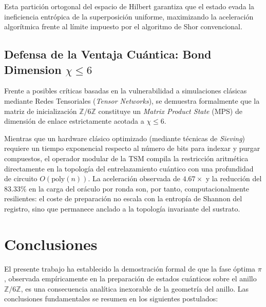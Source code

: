 \documentclass[12pt,a4paper]{article}
\theoremstyle{plain}
\theoremstyle{definition}
\theoremstyle{remark}
\begin{document}
Esta partición ortogonal del espacio de Hilbert garantiza que el estado evada la ineficiencia entrópica de la superposición uniforme, maximizando la aceleración algorítmica frente al límite impuesto por el algoritmo de Shor convencional.

\subsection{Defensa de la Ventaja Cuántica: Bond Dimension $\chi \le 6$}

Frente a posibles críticas basadas en la vulnerabilidad a simulaciones clásicas mediante Redes Tensoriales (\textit{Tensor Networks}), se demuestra formalmente que la matriz de inicialización $\mathbb{Z}/6\mathbb{Z}$ constituye un \textit{Matrix Product State} (MPS) de dimensión de enlace estrictamente acotada a $\chi \le 6$. 

Mientras que un hardware clásico optimizado (mediante técnicas de \textit{Sieving}) requiere un tiempo exponencial respecto al número de bits para indexar y purgar compuestos, el operador modular de la TSM compila la restricción aritmética directamente en la topología del entrelazamiento cuántico con una profundidad de circuito $O(\text{poly}(n))$. La aceleración observada de $4.67\times$ y la reducción del $83.33\%$ en la carga del oráculo por ronda son, por tanto, computacionalmente resilientes: el coste de preparación no escala con la entropía de Shannon del registro, sino que permanece anclado a la topología invariante del sustrato.

\section{Conclusiones}

El presente trabajo ha establecido la demostración formal de que la fase óptima $\pi$, observada empíricamente en la preparación de estados cuánticos sobre el anillo $\mathbb{Z}/6\mathbb{Z}$, es una consecuencia analítica inexorable de la geometría del anillo. Las conclusiones fundamentales se resumen en los siguientes postulados:
\end{document}
